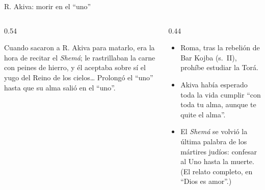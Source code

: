 \begin{frame}{R. Akiva: morir en el ``uno''}
\begin{columns}[c,onlytextwidth]
\begin{column}{0.54\textwidth}
\begin{cita}[colback=dorado!10!papiro,colframe=dorado!80!azul,fontupper=\scriptsize\itshape]Cuando sacaron a R. Akiva para matarlo, era la hora de recitar el \emph{Shemá}; le rastrillaban la carne con peines de hierro, y él aceptaba sobre sí el yugo del Reino de los cielos\ldots{} Prolongó el ``uno'' hasta que su alma salió en el ``uno''.\end{cita}
\begin{center}\scriptsize{}\end{center}
\end{column}
\begin{column}{0.44\textwidth}\small
\begin{itemize}
\item Roma, tras la rebelión de Bar Kojba (s.~II), prohíbe estudiar la Torá.
\item Akiva había esperado toda la vida cumplir ``con toda tu alma, aunque te quite el alma''.
\item El \emph{Shemá} se volvió la última palabra de los mártires judíos: confesar al Uno hasta la muerte. (El relato completo, en ``Dios es amor''.)
\end{itemize}
\end{column}
\end{columns}
\end{frame}

